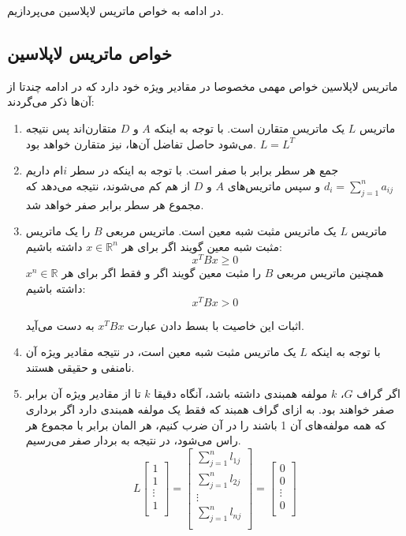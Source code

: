 در ادامه به خواص ماتریس لاپلاسین می‌پردازیم.

\subsection{خواص ماتریس لاپلاسین}\label{sec laplacian properties}
ماتریس لاپلاسین خواص مهمی مخصوصا در مقادیر ویژه خود دارد که در ادامه چندتا از آن‌ها ذکر می‌گردند:
\begin{enumerate}
	\item 
	ماتریس $L$ یک ماتریس متقارن است. با توجه به اینکه $A$ و $D$ متقارن‌اند پس نتیجه می‌شود حاصل تفاضل آن‌ها، نیز متقارن خواهد بود. $L = L^T$
	\item 
	جمع هر سطر برابر با صفر است. با توجه به اینکه در سطر $i$ام داریم 
$d_i = \sum_{j=1}^{n} a_{ij}$
و سپس ماتریس‌های $A$ و $D$ از هم کم می‌شوند، نتیجه می‌دهد که مجموع هر سطر برابر صفر خواهد شد.
	\item 
	ماتریس $L$ یک ماتریس مثبت شبه معین است. ماتریس مربعی $B$ را یک ماتریس مثبت شبه معین گویند اگر برای هر $x \in \mathbb{R}^n$ داشته باشیم:
	\begin{equation}
		x^TBx \ge 0
	\end{equation}
همچنین ماتریس مربعی $B$ را مثبت معین گویند اگر و فقط اگر برای هر $x ^n\in \mathbb{R}$ داشته باشیم:
\begin{equation}
	x^TBx > 0
\end{equation}

اثبات این خاصیت با بسط دادن عبارت $x^TBx$ به دست می‌آید.

	\item 
	با توجه به اینکه $L$ یک ماتریس مثبت شبه معین است، در نتیجه مقادیر ویژه آن نامنفی و حقیقی هستند.
	
	\item
	اگر گراف $G$، $k$ مولفه همبندی داشته باشد، آنگاه دقیقا $k$ تا از مقادیر ویژه آن برابر صفر خواهند بود. به ازای گراف همبند که فقط یک مولفه همبندی دارد اگر برداری که همه مولفه‌های آن 1 باشند را در آن ضرب کنیم، هر المان برابر با مجموع هر راس می‌شود، در نتیجه به بردار صفر می‌رسیم.
\begin{equation}\label{eq L1 = 0}
	L
	\begin{bmatrix}
	1 \\
	1 \\
	\vdots \\
	1 \\
	\end{bmatrix}
	= 
	\begin{bmatrix}
	\sum_{j=1}^{n} l_{1j} \\
	\sum_{j=1}^{n} l_{2j} \\
	\vdots \\
	\sum_{j=1}^{n} l_{nj} \\
	\end{bmatrix}
	= 
	\begin{bmatrix}
	0 \\
	0 \\
	\vdots \\
	0 \\
	\end{bmatrix}
\end{equation}


\end{enumerate}
